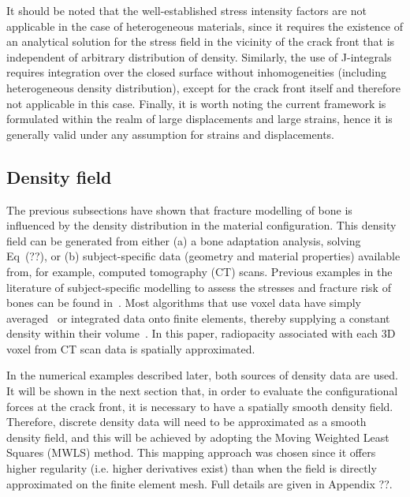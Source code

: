 \documentclass[review]{elsarticle}
\numberwithin{equation}{section}
\begin{document}
It should be noted that the well-established stress intensity factors are not applicable 
in the case of heterogeneous materials, since it requires the existence of
an analytical solution for the stress field in the vicinity of the crack front that is
independent of arbitrary distribution of density. 
Similarly, the use of
J-integrals requires integration over the closed surface without
inhomogeneities (including heterogeneous density distribution), except for the crack front itself and therefore not applicable in this case.
Finally, it is worth noting the current framework is formulated within 
the realm of large displacements and large strains, hence it 
is generally valid under any assumption for strains and displacements.




\subsection{Density field}
\label{sec:dens_mapping}
The previous subsections have shown that  fracture modelling of bone is influenced by the density distribution in the material configuration. This density field can be generated from either (a) a bone adaptation analysis, solving Eq~(??), or (b) subject-specific data (geometry and material properties) available from, for example, computed tomography (CT) scans. Previous examples in the literature of subject-specific modelling to assess the stresses and fracture risk of bones can be found in~\citep{poelert2013patient,Helgason2008b,Yosibash2010}. Most algorithms that use voxel data have simply averaged~\citep{zannoni1999material} or integrated data  onto finite elements, thereby supplying a constant density within their volume~\citep{taddei2007material, schileo2008subject}. In this paper, radiopacity associated with each 3D voxel from CT scan data is spatially approximated. 

In the numerical examples described later, both sources of density data are used. It will be shown in the next section that, in order to evaluate the configurational forces at the crack front, it is necessary to have a spatially smooth density field. Therefore, discrete density data will need to be approximated as a smooth density field, and this will be achieved by adopting the Moving Weighted Least Squares (MWLS) method. This mapping approach was chosen since it offers higher regularity (i.e. higher derivatives exist) than when the field is
directly approximated on the finite element mesh. Full details are given in Appendix ??. 
\end{document}
